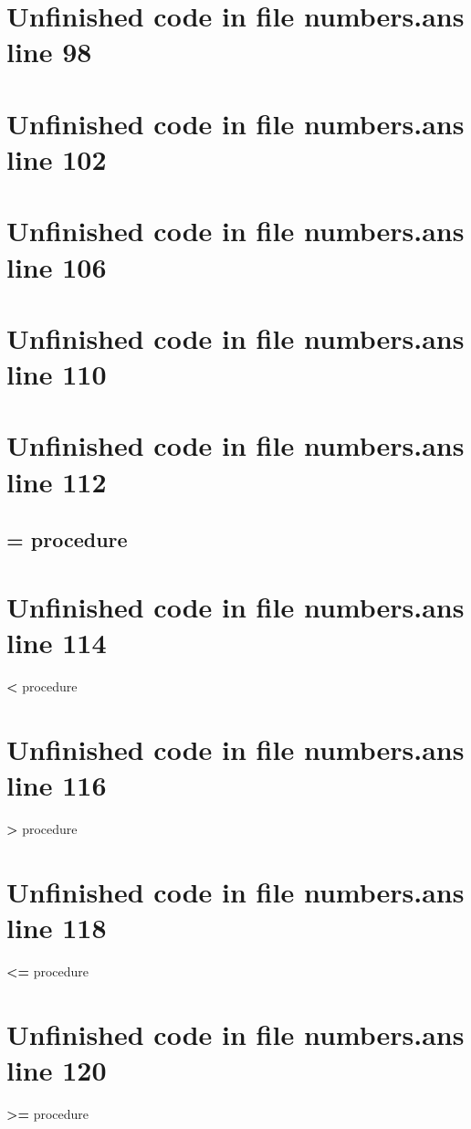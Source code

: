 \documentclass[twoside,9pt]{report}
\begin{document}
\section{Unfinished code in file numbers.ans line 98}
\section{Unfinished code in file numbers.ans line 102}
\section{Unfinished code in file numbers.ans line 106}
\section{Unfinished code in file numbers.ans line 110}
\section{Unfinished code in file numbers.ans line 112}
\subsection{= procedure}
\label{=-procedure}
\section{Unfinished code in file numbers.ans line 114}

\noindent \textbf{<} procedure

\section{Unfinished code in file numbers.ans line 116}

\noindent \textbf{>} procedure

\section{Unfinished code in file numbers.ans line 118}

\noindent \textbf{<=} procedure

\section{Unfinished code in file numbers.ans line 120}

\noindent \textbf{>=} procedure
\end{document}
